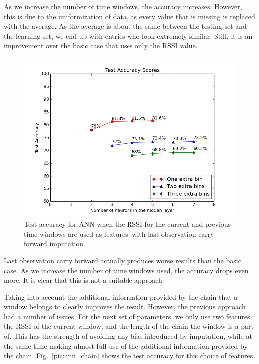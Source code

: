 As we increase the number of time windows, the accuracy increases. However, this is due to the uniformization of data, as every value that is missing is replaced with the average. As the average is about the same between the testing set and the learning set, we end up with entries who look extremely similar. Still, it is an improvement over the basic case that uses only the RSSI value.  

\begin{figure}[h]
	\begin{center}
		\includegraphics[scale=0.6]{figures/ann_params1.png}
	\end{center}
	
	\caption{Test accuracy for ANN when the RSSI for the current and previous time windows are used as features, with last observation carry forward imputation.}
	\label{pic:ann_params2}

\end{figure}

Last observation carry forward actually produces worse results than the basic case. As we increase the number of time windows used, the accuracy drops even more. It is clear that this is not a suitable approach 

Taking into account the additional information provided by the chain that a window belongs to clearly improves the result. However, the previous approach had a number of issues. For the next set of parameters, we only use two features: the RSSI of the current window, and the length of the chain the window is a part of. This has the strength of avoiding any bias introduced by imputation, while at the same time making almost full use of the additional information provided by the chain. Fig.~\ref{pic:ann_chain} shows the test accuracy for this choice of features.

